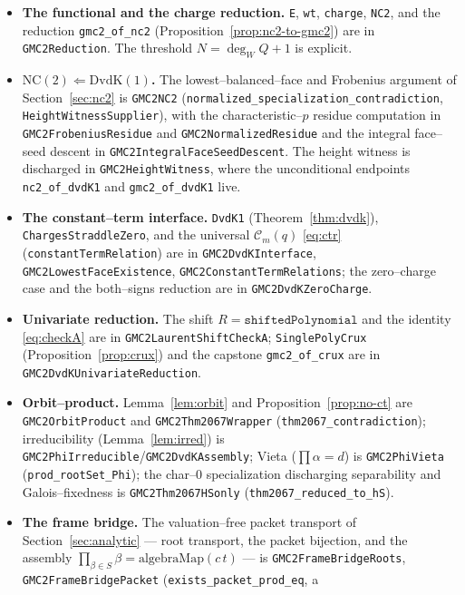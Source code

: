 \documentclass[11pt,reqno]{amsart}
\theoremstyle{plain}
\theoremstyle{definition}
\begin{document}
\begin{itemize}[leftmargin=1.4em]
\item \textbf{The functional and the charge reduction.} \texttt{E}, \texttt{wt}, \texttt{charge},
\texttt{NC2}, and the reduction \texttt{gmc2\_of\_nc2} (Proposition~\ref{prop:nc2-to-gmc2}) are in
\texttt{GMC2Reduction}. The threshold $N=\deg_W Q+1$ is explicit.
\item \textbf{$\mathrm{NC}(2)\Leftarrow\mathrm{DvdK}(1)$.} The lowest--balanced--face and Frobenius
argument of Section~\ref{sec:nc2} is \texttt{GMC2NC2}
(\texttt{normalized\_specialization\_contradiction}, \texttt{HeightWitnessSupplier}), with the
characteristic--$p$ residue computation in \texttt{GMC2FrobeniusResidue} and \texttt{GMC2NormalizedResidue}
and the integral face--seed descent in \texttt{GMC2IntegralFaceSeedDescent}. The height witness is
discharged in \texttt{GMC2HeightWitness}, where the unconditional endpoints \texttt{nc2\_of\_dvdK1} and
\texttt{gmc2\_of\_dvdK1} live.
\item \textbf{The constant--term interface.} \texttt{DvdK1} (Theorem~\ref{thm:dvdk}),
\texttt{ChargesStraddleZero}, and the universal $\mathcal C_m(q)$ \eqref{eq:ctr}
(\texttt{constantTermRelation}) are in \texttt{GMC2DvdKInterface},
\texttt{GMC2LowestFaceExistence}, \texttt{GMC2ConstantTermRelations}; the zero--charge case and the
both--signs reduction are in \texttt{GMC2DvdKZeroCharge}.
\item \textbf{Univariate reduction.} The shift $R=\texttt{shiftedPolynomial}$ and the identity
\eqref{eq:checkA} are in \texttt{GMC2LaurentShiftCheckA}; \texttt{SinglePolyCrux}
(Proposition~\ref{prop:crux}) and the capstone \texttt{gmc2\_of\_crux} are in
\texttt{GMC2DvdKUnivariateReduction}.
\item \textbf{Orbit--product.} Lemma~\ref{lem:orbit} and Proposition~\ref{prop:no-ct} are
\texttt{GMC2OrbitProduct} and \texttt{GMC2Thm2067Wrapper}
(\texttt{thm2067\_contradiction}); irreducibility (Lemma~\ref{lem:irred}) is
\texttt{GMC2PhiIrreducible}/\texttt{GMC2DvdKAssembly}; Vieta ($\prod\alpha=d$) is
\texttt{GMC2PhiVieta} (\texttt{prod\_rootSet\_Phi}); the char--$0$ specialization discharging
separability and Galois--fixedness is \texttt{GMC2Thm2067HSonly} (\texttt{thm2067\_reduced\_to\_hS}).
\item \textbf{The frame bridge.} The valuation--free packet transport of
Section~\ref{sec:analytic} --- root transport, the packet bijection, and the assembly
$\prod_{\beta\in S}\beta=\text{algebraMap}(c\,t)$ --- is
\texttt{GMC2FrameBridgeRoots}, \texttt{GMC2FrameBridgePacket} (\texttt{exists\_packet\_prod\_eq}, a

\end{itemize}
\end{document}
